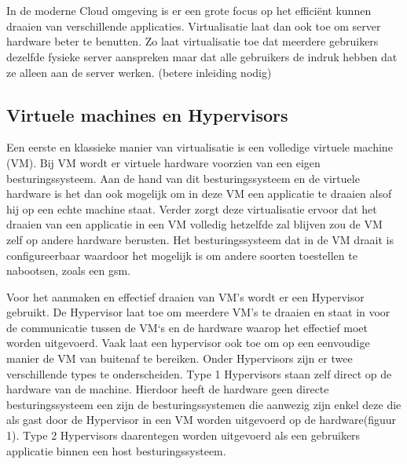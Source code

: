\chapter{}
\label{ch:stand-van-zaken}
In de moderne Cloud omgeving is er een grote focus op het efficiënt kunnen draaien van verschillende applicaties. Virtualisatie laat dan ook toe om server hardware beter te benutten. Zo laat virtualisatie toe dat meerdere gebruikers dezelfde fysieke server aanspreken maar dat alle gebruikers de indruk hebben dat ze alleen aan de server werken. \autocite{Yadav2018} (betere inleiding nodig)



\section{Virtuele machines en Hypervisors}
Een eerste en klassieke manier van virtualisatie is een volledige virtuele machine (VM). Bij VM wordt er virtuele hardware voorzien van een eigen besturingssysteem. Aan de hand van dit besturingssysteem en de virtuele hardware is het dan ook mogelijk om in deze VM een applicatie te draaien alsof hij op een echte machine staat. Verder zorgt deze virtualisatie ervoor dat het draaien van een applicatie in een VM volledig hetzelfde zal blijven zou de VM zelf op andere hardware berusten. Het besturingssysteem dat in de VM draait is configureerbaar waardoor het mogelijk is om andere soorten toestellen te nabootsen, zoals een gsm.\autocite{Eder2016}

Voor het aanmaken en effectief draaien van VM’s wordt er een Hypervisor gebruikt. De Hypervisor laat toe om meerdere VM’s te draaien en staat in voor de communicatie tussen de VM‘s en de hardware waarop het effectief moet worden uitgevoerd. Vaak laat een hypervisor ook toe om op een eenvoudige manier de VM van buitenaf te bereiken.  Onder Hypervisors zijn er twee verschillende  types te onderscheiden. Type 1 Hypervisors staan zelf direct op de hardware van de machine. Hierdoor heeft de hardware geen directe besturingssysteem een zijn de besturingssystemen die aanwezig zijn enkel deze die als gast door de Hypervisor in een VM worden uitgevoerd op de hardware(figuur 1). Type 2 Hypervisors daarentegen worden uitgevoerd als een gebruikers applicatie binnen een host besturingssysteem. \autocite{Yadav2018,Eder2016}

